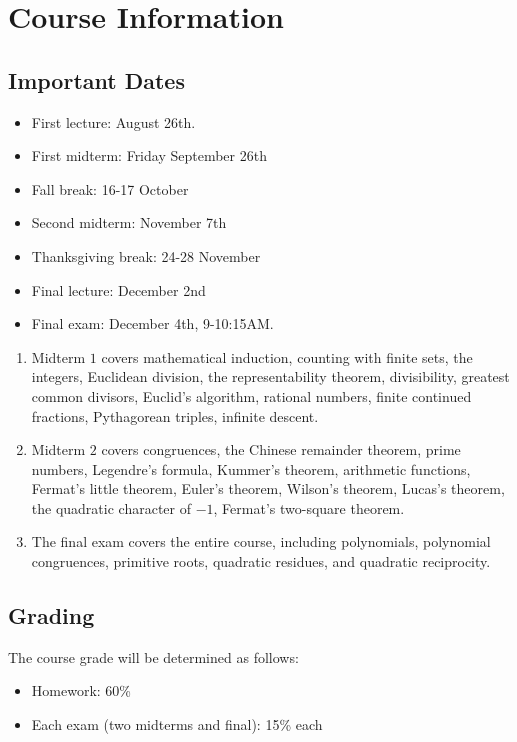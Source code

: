 \chapter{Course Information}

\section*{Important Dates}
\begin{itemize}
\item First lecture: August 26th.
\item First midterm: Friday September 26th
\item Fall break: 16-17 October
\item Second midterm: November 7th
\item Thanksgiving break: 24-28 November
\item Final lecture: December 2nd
\item Final exam: December 4th, 9-10:15AM.
\end{itemize}

\begin{enumerate}
\item Midterm $1$ covers mathematical induction, counting with finite sets, the integers, Euclidean division, the representability theorem, divisibility, greatest common divisors, Euclid's algorithm, rational numbers, finite continued fractions, Pythagorean triples, infinite descent.
\item Midterm $2$ covers congruences, the Chinese remainder theorem, prime numbers, Legendre's formula, Kummer's theorem, arithmetic functions, Fermat's little theorem, Euler's theorem, Wilson's theorem, Lucas's theorem, the quadratic character of $-1$, Fermat's two-square theorem.
\item The final exam covers the entire course, including polynomials, polynomial congruences, primitive roots, quadratic residues, and quadratic reciprocity.
\end{enumerate}

\section*{Grading}
The course grade will be determined as follows:

\begin{itemize}
    \item Homework: 60\%
    \item Each exam (two midterms and final): 15\% each
\end{itemize}

